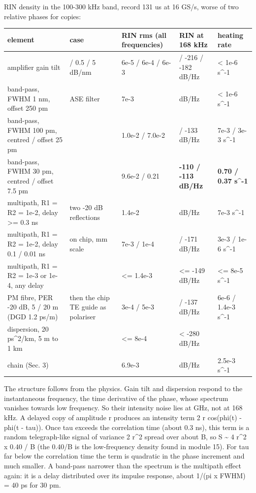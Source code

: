 RIN density in the 100-300 kHz band, record 131 us at 16 GS/s, worse of
two relative phases for copies:

{\footnotesize
\begin{longtable}[]{@{}>{\raggedright\arraybackslash}p{0.293\dimexpr(\linewidth-10\tabcolsep)\relax}>{\raggedright\arraybackslash}p{0.223\dimexpr(\linewidth-10\tabcolsep)\relax}>{\raggedright\arraybackslash}p{0.210\dimexpr(\linewidth-10\tabcolsep)\relax}>{\raggedright\arraybackslash}p{0.153\dimexpr(\linewidth-10\tabcolsep)\relax}>{\raggedright\arraybackslash}p{0.121\dimexpr(\linewidth-10\tabcolsep)\relax}@{}}
\toprule\noalign{}
element & case & RIN rms (all frequencies) & RIN at 168 kHz & heating
rate \\
\midrule\noalign{}
\endhead
\bottomrule\noalign{}
\endlastfoot
amplifier gain tilt & 0.05 / 0.5 / 5 dB/nm & 6e-5 / 6e-4 / 6e-3 & -237 /
-216 / -182 dB/Hz & \textless{} 1e-6 s\^{}-1 \\
band-pass, FWHM 1 nm, offset 250 pm & ASE filter & 7e-3 & -173 dB/Hz &
\textless{} 1e-6 s\^{}-1 \\
band-pass, FWHM 100 pm, centred / offset 25 pm & & 1.0e-2 / 7.0e-2 &
-130 / -133 dB/Hz & 7e-3 / 3e-3 s\^{}-1 \\
band-pass, FWHM 30 pm, centred / offset 7.5 pm & & 9.6e-2 / 0.21 &
\textbf{-110 / -113 dB/Hz} & \textbf{0.70 / 0.37 s\^{}-1} \\
multipath, R1 = R2 = 1e-2, delay \textgreater= 0.3 ns & two -20 dB
reflections & 1.4e-2 & -130 dB/Hz & 7e-3 s\^{}-1 \\
multipath, R1 = R2 = 1e-2, delay 0.1 / 0.01 ns & on chip, mm scale &
7e-3 / 1e-4 & -133 / -171 dB/Hz & 3e-3 / 1e-6 s\^{}-1 \\
multipath, R1 = R2 = 1e-3 or 1e-4, any delay & & \textless= 1.4e-3 &
\textless= -149 dB/Hz & \textless= 8e-5 s\^{}-1 \\
PM fibre, PER -20 dB, 5 / 20 m (DGD 1.2 ps/m) & then the chip TE guide
as polariser & 3e-4 / 5e-3 & -161 / -137 dB/Hz & 6e-6 / 1.4e-3
s\^{}-1 \\
dispersion, 20 ps\^{}2/km, 5 m to 1 km & & \textless= 8e-4 & \textless{}
-280 dB/Hz & 0 \\
chain (Sec. 3) & & 6.9e-3 & -134.5 dB/Hz & 2.5e-3 s\^{}-1 \\
\end{longtable}
}

The structure follows from the physics. Gain tilt and dispersion respond
to the instantaneous frequency, the time derivative of the phase, whose
spectrum vanishes towards low frequency. So their intensity noise lies
at GHz, not at 168 kHz. A delayed copy of amplitude r produces an
intensity term 2 r cos(phi(t) - phi(t - tau)). Once tau exceeds the
correlation time (about 0.3 ns), this term is a random telegraph-like
signal of variance 2 r\^{}2 spread over about B, so S \textasciitilde{}
4 r\^{}2 x 0.40 / B (the 0.40/B is the low-frequency density found in
module 15). For tau far below the correlation time the term is quadratic
in the phase increment and much smaller. A band-pass narrower than the
spectrum is the multipath effect again: it is a delay distributed over
its impulse response, about 1/(pi x FWHM) = 40 ps for 30 pm.

